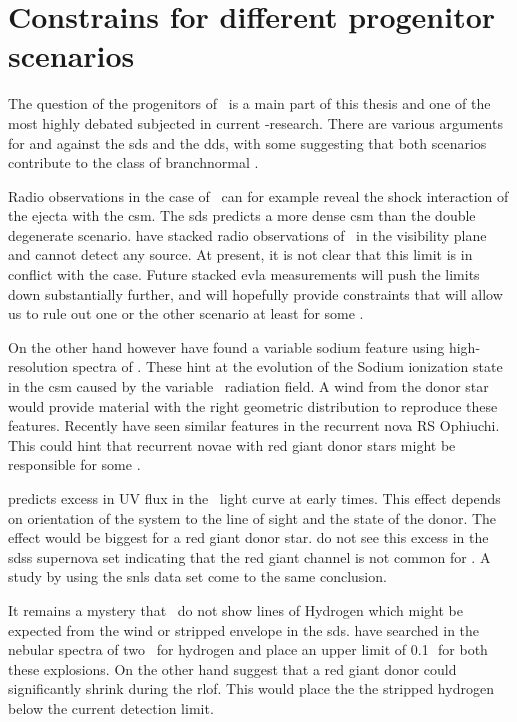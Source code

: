 \section{Constrains for different progenitor scenarios}
\label{sec:progenitor_constraints}
The question of the progenitors of \sneia\ is a main part of this thesis and one of the most highly debated subjected in current \sneia-research. There are various arguments for and against the \gls{sds} and the \gls{dds}, with some suggesting that both scenarios contribute to the class of \gls{branchnormal} \sneia.

Radio observations in the case of \sneia\ can for example reveal the shock interaction of the ejecta with the \gls{csm}. The \gls{sds} predicts a more dense \gls{csm} than the double degenerate scenario. \citet{2011arXiv1105.6188H} have stacked radio observations of \sneia\ in the visibility plane and cannot detect any source. At present, it is not clear that this limit is in conflict with the \sd case. Future stacked \gls{evla} measurements will push the limits down substantially further, and will hopefully provide constraints that will allow us to rule out one or the other scenario at least for some \sneia.

On the other hand however \cite{2007Sci...317..924P} have found a variable sodium feature using high-resolution spectra of \sneia. These hint at the evolution of the Sodium ionization state in the \gls{csm} caused by the variable \snia\ radiation field. A wind from the donor star would provide material with the right geometric distribution to reproduce these features. Recently \cite{2011A&A...530A..63P} have seen similar features in the recurrent nova RS Ophiuchi. This could hint that recurrent novae with red giant donor stars might be responsible for some \sneia. 


\cite{2010ApJ...708.1025K} predicts excess in UV flux in the \snia\ light curve at early times. This effect depends on orientation of the system to the line of sight and the state of the donor. The effect would be biggest for a red giant donor star. \cite{2010ApJ...722.1691H} do not see this excess in the \gls{sdss} supernova set indicating that the red giant channel is not common for \sneia. A study by \cite{2011arXiv1106.4008B} using the \gls{snls} data set come to the same conclusion.

It remains a mystery that \sneia\ do not show lines of Hydrogen which might be expected from the wind or stripped envelope in the \gls{sds}. \citet{2007ApJ...670.1275L} have searched in the nebular spectra of two \sneia\ for hydrogen and place an upper limit of 0.1\,\msun\ for both these explosions. On the other hand \citet{2011ApJ...730L..34J} suggest that a red giant donor could significantly shrink during the \gls{rlof}. This would place the the stripped hydrogen below the current detection limit. 


